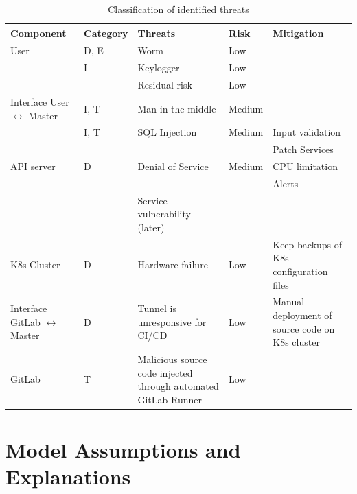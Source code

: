 \begin{table}
    \centering
    \caption{Classification of identified threats}
    \label{tab:threats-classification}
    \begin{tabular*}{\textwidth}{p{2.1cm} p{1.8cm} p{3cm} p{2cm} p{3.5cm}}
        \textbf{Component} & \textbf{Category} & \textbf{Threats} & \textbf{Risk} & \textbf{Mitigation} \\
        \hline
        User                & D, E & Worm & Low & \\
                            & I & Keylogger & Low & \\
                            & & Residual risk & Low & \\
        \hline
        Interface User \(\leftrightarrow\) Master   & I, T & Man-in-the-middle & Medium & \\
                                & I, T & SQL Injection & Medium & Input validation \\
                                & & & & Patch Services \\
        \hline
        API server          & D & Denial of Service & Medium & CPU limitation \\
                            & & & & Alerts \\
                            & & Service vulnerability (later) & & \\
        \hline
        K8s Cluster             & D & Hardware failure & Low & Keep backups of K8s configuration files \\
        \hline
        Interface GitLab \(\leftrightarrow\) Master & D & Tunnel is unresponsive for CI/CD & Low & Manual deployment of source code on K8s cluster \\
        \hline
        GitLab             & T & Malicious source code injected through automated GitLab Runner & Low & \\ 
        \hline
    \end{tabular*}
\end{table}


\section{Model Assumptions and Explanations}

